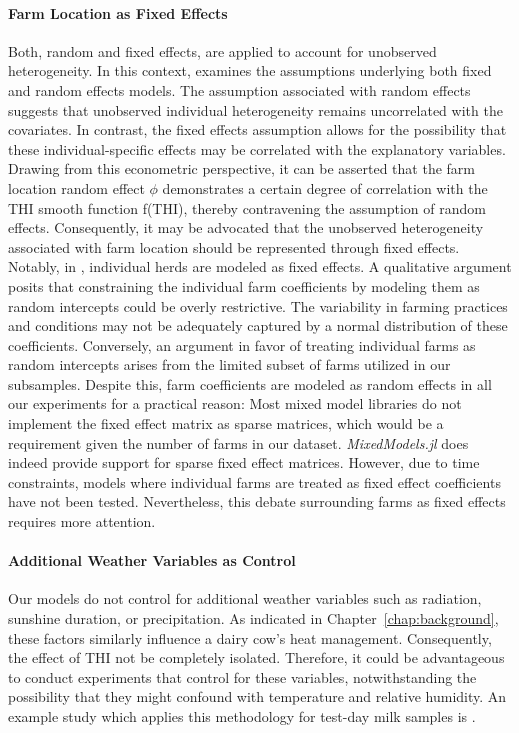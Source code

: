\paragraph{Farm Location as Fixed Effects} Both, random and fixed effects, are applied to account for unobserved heterogeneity. In this context, \citet[Chapter 10]{woolridge_2010} examines the assumptions underlying both fixed and random effects models. The assumption associated with random effects suggests that unobserved individual heterogeneity remains uncorrelated with the covariates. In contrast, the fixed effects assumption allows for the possibility that these individual-specific effects may be correlated with the explanatory variables. Drawing from this econometric perspective, it can be asserted that the farm location random effect $\phi$ demonstrates a certain degree of correlation with the THI smooth function f(THI), thereby contravening the assumption of random effects. Consequently, it may be advocated that the unobserved heterogeneity associated with farm location should be represented through fixed effects. Notably, in \cite{bryant_quantifying_2007}, individual herds are modeled as fixed effects. A qualitative argument posits that constraining the individual farm coefficients by modeling them as random intercepts could be overly restrictive. The variability in farming practices and conditions may not be adequately captured by a normal distribution of these coefficients. Conversely, an argument in favor of treating individual farms as random intercepts arises from the limited subset of farms utilized in our subsamples. Despite this, farm coefficients are modeled as random effects in all our experiments for a practical reason: Most mixed model libraries do not implement the fixed effect matrix as sparse matrices, which would be a requirement given the number of farms in our dataset. \textit{MixedModels.jl} does indeed provide support for sparse fixed effect matrices. However, due to time constraints, models where individual farms are treated as fixed effect coefficients have not been tested. Nevertheless, this debate surrounding farms as fixed effects requires more attention. 

\paragraph{Additional Weather Variables as Control}
Our models do not control for additional weather variables such as radiation, sunshine duration, or precipitation. As indicated in Chapter~\ref{chap:background}, these factors similarly influence a dairy cow's heat management. Consequently, the effect of THI not be completely isolated. Therefore, it could be advantageous to conduct experiments that control for these variables, notwithstanding the possibility that they might confound with temperature and relative humidity. An example study which applies this methodology for test-day milk samples is \cite{ahmed_temperature_2022}.


